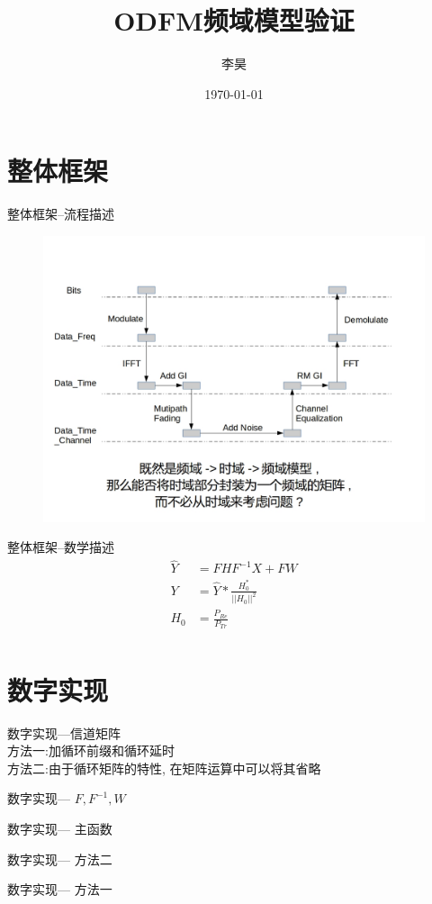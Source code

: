 \documentclass[UTF8]{ctexbeamer}
\title{ODFM频域模型验证}
\date{\today}
\author{李昊}
\institute{通信系统仿真大作业}
\begin{document}
  \maketitle
  \section{整体框架}
  \begin{frame}{整体框架--流程描述}
	\begin{figure}
	  \includegraphics[width=\textwidth]{figure/top.jpg}
	\end{figure}
  \end{frame}
  \begin{frame}{整体框架--数学描述}
	\begin{equation*}
	  \begin{aligned}
	\hat Y &= FHF^{-1}X+FW \\
	 Y &= \hat Y * \frac{H_0^*}{||H_0||^2}\\
	 H_0 &= \frac{P_{Re}}{P_{Tr}} \\
	  \end{aligned}
	\end{equation*}
  \end{frame}

  \section{数字实现}
  \begin{frame}{数字实现---信道矩阵}
	\\方法一:加循环前缀和循环延时
	\scalebox{0.5}{  }
	\\方法二:由于循环矩阵的特性, 在矩阵运算中可以将其省略
	\scalebox{0.5}{  }
  \end{frame}
  \begin{frame}{数字实现--- $F, F^{-1}, W$ }
	
  \end{frame}
  \begin{frame}{数字实现--- 主函数 }
	
  \end{frame}
  \begin{frame}{数字实现--- 方法二 }
	
  \end{frame}
  \begin{frame}{数字实现--- 方法一 }
	
  \end{frame}
\end{document}
